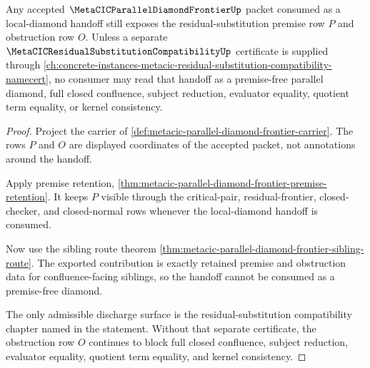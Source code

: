 \begin{theorem}
\label{thm:metacic-parallel-diamond-frontier-discharge-obstruction}
Any accepted $\MetaCICParallelDiamondFrontierUp$ packet consumed as a local-diamond handoff still exposes the residual-substitution premise row $P$ and obstruction row $O$. Unless a separate $\MetaCICResidualSubstitutionCompatibilityUp$ certificate is supplied through \autoref{ch:concrete-instances-metacic-residual-substitution-compatibility-namecert}, no consumer may read that handoff as a premise-free parallel diamond, full closed confluence, subject reduction, evaluator equality, quotient term equality, or kernel consistency.
\end{theorem}
\begin{proof}
Project the carrier of \autoref{def:metacic-parallel-diamond-frontier-carrier}. The rows $P$ and $O$ are displayed coordinates of the accepted packet, not annotations around the handoff.

Apply premise retention, \autoref{thm:metacic-parallel-diamond-frontier-premise-retention}. It keeps $P$ visible through the critical-pair, residual-frontier, closed-checker, and closed-normal rows whenever the local-diamond handoff is consumed.

Now use the sibling route theorem \autoref{thm:metacic-parallel-diamond-frontier-sibling-route}. The exported contribution is exactly retained premise and obstruction data for confluence-facing siblings, so the handoff cannot be consumed as a premise-free diamond.

The only admissible discharge surface is the residual-substitution compatibility chapter named in the statement. Without that separate certificate, the obstruction row $O$ continues to block full closed confluence, subject reduction, evaluator equality, quotient term equality, and kernel consistency.
\end{proof}

